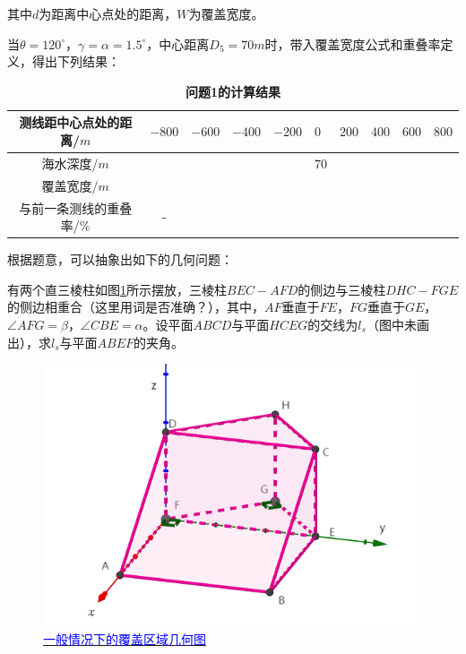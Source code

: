 其中$d$为距离中心点处的距离，$W$为覆盖宽度。

当$\theta = 120^\circ$，$\gamma=\alpha=1.5^\circ$，中心距离$D_5 = 70m$时，带入覆盖宽度公式和重叠率定义，得出下列结果：

\begin{table}[h]
    \centering
    \caption{\textbf{问题1的计算结果}}
    \begin{tabular}{@{}ccllllllll@{}}
    \toprule
    测线距中心点处的距离/$m$  & $-800$ & $-600$ & $-400$ & $-200$ & $0$ & $200$ & $400$ & $600$ & $800$ \\ \midrule
    海水深度/$m$        &      &      &      &      & 70  &     &     &     &     \\
    覆盖宽度/$m$        &      &      &      &      &   &     &     &     &     \\
    与前一条测线的重叠率/$\%$ &   -  &      &      &      &   &     &     &     &     \\ \bottomrule
    \end{tabular}
\end{table}



根据题意，可以抽象出如下的几何问题：

有两个直三棱柱如图\ref{fig:一般情况下的覆盖区域几何图}所示摆放，三棱柱$BEC-AFD$的侧边与三棱柱$DHC-FGE$的侧边相重合（这里用词是否准确？），其中，$AF$垂直于$FE$，$FG$垂直于$GE$，$\angle AFG=\beta$，$\angle CBE=\alpha$。设平面$ABCD$与平面$HCEG$的交线为$l_s$（图中未画出），求$l_s$与平面$ABEF$的夹角。

\begin{figure}[h]
    \centering
    \includegraphics[scale=0.4]{res/img/一般情况下的覆盖区域几何图.png}
    \caption{\href{https://www.geogebra.org/m/absuxwpk}{\textcolor{blue}{一般情况下的覆盖区域几何图}}}
    \label{fig:一般情况下的覆盖区域几何图}
\end{figure}

